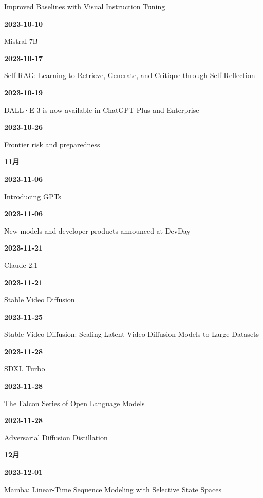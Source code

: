{\raggedright Improved Baselines with Visual Instruction Tuning\par}
\smallskip
\noindent\textbf{2023-10-10}\par
{\raggedright Mistral 7B\par}
\smallskip
\noindent\textbf{2023-10-17}\par
{\raggedright Self-RAG: Learning to Retrieve, Generate, and Critique through Self-Reflection\par}
\smallskip
\noindent\textbf{2023-10-19}\par
{\raggedright DALL·E 3 is now available in ChatGPT Plus and Enterprise\par}
\smallskip
\noindent\textbf{2023-10-26}\par
{\raggedright Frontier risk and preparedness\par}
\smallskip
\medskip
\noindent\textbf{11月}\par
\smallskip
\noindent\textbf{2023-11-06}\par
{\raggedright Introducing GPTs\par}
\smallskip
\noindent\textbf{2023-11-06}\par
{\raggedright New models and developer products announced at DevDay\par}
\smallskip
\noindent\textbf{2023-11-21}\par
{\raggedright Claude 2.1\par}
\smallskip
\noindent\textbf{2023-11-21}\par
{\raggedright Stable Video Diffusion\par}
\smallskip
\noindent\textbf{2023-11-25}\par
{\raggedright Stable Video Diffusion: Scaling Latent Video Diffusion Models to Large Datasets\par}
\smallskip
\noindent\textbf{2023-11-28}\par
{\raggedright SDXL Turbo\par}
\smallskip
\noindent\textbf{2023-11-28}\par
{\raggedright The Falcon Series of Open Language Models\par}
\smallskip
\noindent\textbf{2023-11-28}\par
{\raggedright Adversarial Diffusion Distillation\par}
\smallskip
\medskip
\noindent\textbf{12月}\par
\smallskip
\noindent\textbf{2023-12-01}\par
{\raggedright Mamba: Linear-Time Sequence Modeling with Selective State Spaces\par}
